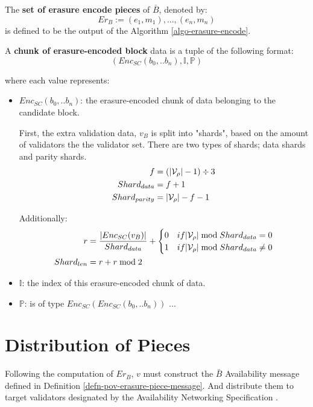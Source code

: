 \begin{definition}
  \label{defn-erasure-coded-pieces}
  The {\bf set of erasure encode pieces} of $\bar{B}$, denoted by:
  \[
   Er_B := {(e_1, m_1),...,(e_n,m_n)}
   \]
   is defined to be the output of the Algorithm \ref{algo-erasure-encode}.
\end{definition}

\begin{definition}
  \label{defn-erasure-chunk}
  A \textbf{chunk of erasure-encoded block} data is a tuple of the following format:
  \[
    (Enc_{SC}(b_0, .. b_n), \mathbb{I}, \mathbb{P})
  \]

  where each value represents:
  \begin{itemize}
    \item $Enc_{SC}(b_0, .. b_n)$: the erasure-encoded chunk of data belonging
    to the candidate block.

    First, the extra validation data, $v_B$ is split into "shards", based on the
    amount of validators the the validator set. There are two types of shards;
    data shards and parity shards.
    \begin{alignat*}{2}
      f &= (|\mathcal{V}_\rho| - 1) \div 3 \\
      Shard_{data} &= f + 1 \\
      Shard_{parity} &= |\mathcal{V}_\rho| - f - 1
    \end{alignat*}

    Additionally:
    \begin{alignat*}{2}
      r &= \frac{|Enc_{SC}(v_B)|}{Shard_{data}} +
      \begin{cases}
        0 & if |\mathcal{V}_\rho| \bmod{Shard_{data}} = 0 \\
        1 & if |\mathcal{V}_\rho| \bmod{Shard_{data}} \neq 0 \\
      \end{cases} \\
      Shard_{len} &= r + r \bmod{2}
    \end{alignat*}

    \item $\mathbb{I}$: the index of this erasure-encoded chunk of data.
    \item $\mathbb{P}$: is of type $Enc_{SC}(Enc_{SC}(b_0, .. b_n))$ ...
  \end{itemize}
\end{definition}

\section{Distribution of Pieces}\label{sect-distribute-pieces} Following the
computation of $Er_B$, $v$ must construct the $\bar{B}$ Availability message
defined in Definition \ref{defn-pov-erasure-piece-message}. And distribute them
to target validators designated by the Availability Networking Specification
\cite{??}.

